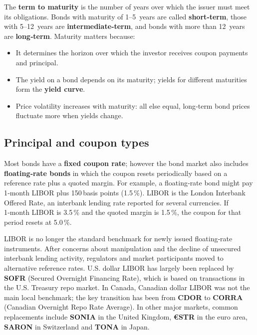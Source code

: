 \documentclass[
  letterpaper,
  DIV=11,
  numbers=noendperiod]{scrartcl}
\providecommand{\tightlist}{%
  \setlength{\itemsep}{0pt}\setlength{\parskip}{0pt}}
\begin{document}
The \textbf{term to maturity} is the number of years over which the
issuer must meet its obligations. Bonds with maturity of 1--5~years are
called \textbf{short‑term}, those with 5--12~years are
\textbf{intermediate‑term}, and bonds with more than 12~years are
\textbf{long‑term}. Maturity matters because:

\begin{itemize}
\tightlist
\item
  It determines the horizon over which the investor receives coupon
  payments and principal.
\item
  The yield on a bond depends on its maturity; yields for different
  maturities form the \textbf{yield curve}.
\item
  Price volatility increases with maturity: all else equal, long‑term
  bond prices fluctuate more when yields change.
\end{itemize}

\subsection{Principal and coupon
types}\label{principal-and-coupon-types}

Most bonds have a \textbf{fixed coupon rate}; however the bond market
also includes \textbf{floating‑rate bonds} in which the coupon resets
periodically based on a reference rate plus a quoted margin. For
example, a floating‑rate bond might pay 1‑month LIBOR plus 150\,basis
points (1.5\,\%). LIBOR is the London Interbank Offered Rate, an
interbank lending rate reported for several currencies. If 1‑month LIBOR
is 3.5\,\% and the quoted margin is 1.5\,\%, the coupon for that period
resets at 5.0\,\%.

\begin{tcolorbox}[enhanced jigsaw, titlerule=0mm, rightrule=.15mm, bottomtitle=1mm, colframe=quarto-callout-note-color-frame, opacitybacktitle=0.6, coltitle=black, breakable, toprule=.15mm, title=\textcolor{quarto-callout-note-color}{\faInfo}\hspace{0.5em}{Market update -- LIBOR transition}, leftrule=.75mm, colbacktitle=quarto-callout-note-color!10!white, left=2mm, arc=.35mm, opacityback=0, toptitle=1mm, bottomrule=.15mm, colback=white]

LIBOR is no longer the standard benchmark for newly issued floating‑rate
instruments. After concerns about manipulation and the decline of
unsecured interbank lending activity, regulators and market participants
moved to alternative reference rates. U.S. dollar LIBOR has largely been
replaced by \textbf{SOFR} (Secured Overnight Financing Rate), which is
based on transactions in the U.S. Treasury repo market. In Canada,
Canadian dollar LIBOR was not the main local benchmark; the key
transition has been from \textbf{CDOR} to \textbf{CORRA} (Canadian
Overnight Repo Rate Average). In other major markets, common
replacements include \textbf{SONIA} in the United Kingdom, \textbf{€STR}
in the euro area, \textbf{SARON} in Switzerland and \textbf{TONA} in
Japan.

\end{tcolorbox}
\end{document}
